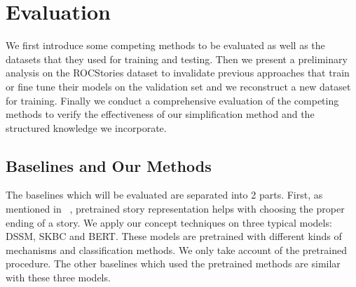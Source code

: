 \section{Evaluation}
\label{sec:experiment}


We first introduce some competing methods to be evaluated as well as
the datasets that they used for training and testing.
Then we present a preliminary analysis on the ROCStories dataset to invalidate
previous approaches that train or fine tune their models on the validation
set and we reconstruct a new dataset for training. Finally we conduct a comprehensive
evaluation of the competing methods to verify the effectiveness of our simplification method and 
the structured knowledge we incorporate.

\subsection{Baselines and Our Methods}
\label{sec:baselines}
The baselines which will be evaluated are separated into 2 parts.
First, as mentioned in ~, pretrained story representation 
helps with choosing the proper ending of a story. 
We apply our concept techniques on three typical 
models: DSSM, SKBC and BERT. 
These models are pretrained with different kinds of mechanisms
 and classification methods. We only take account of the 
 pretrained procedure. The other baselines which used the pretrained 
 methods are similar with these three models.

